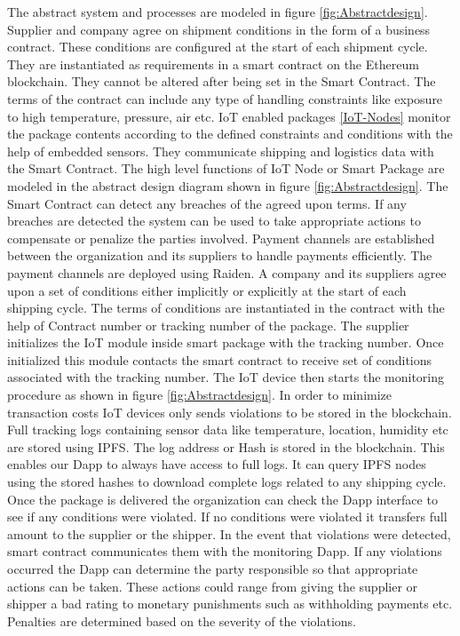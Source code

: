 The abstract system and processes are modeled in figure \ref{fig:Abstractdesign}. Supplier and company agree on shipment conditions in the form of a business contract. These conditions are configured at the start of each shipment cycle. They are instantiated as requirements in a smart contract on the Ethereum blockchain. They cannot be altered after being set in the Smart Contract. The terms of the contract can include any type of handling constraints like exposure to high temperature, pressure, air etc. IoT enabled packages \ref{IoT-Nodes} monitor the package contents according to the defined constraints and conditions with the help of embedded sensors. They communicate shipping and logistics data with the Smart Contract. The high level functions of IoT Node or Smart Package are modeled in the abstract design diagram shown in figure \ref{fig:Abstractdesign}.
\clearpage
The Smart Contract can detect any breaches of the agreed upon terms. If any breaches are detected the system can be used to take appropriate actions to compensate or penalize the parties involved. Payment channels are established between the organization and its suppliers to handle payments efficiently. The payment channels are deployed using Raiden. A company and its suppliers agree upon a set of conditions either implicitly or explicitly at the start of each shipping cycle. The terms of conditions are instantiated in the contract with the help of Contract number or tracking number of the package. The supplier initializes the IoT module inside smart package with the tracking number. Once initialized this module contacts the smart contract to receive set of conditions associated with the tracking number. The IoT device then starts the monitoring procedure as shown in figure \ref{fig:Abstractdesign}. In order to minimize transaction costs IoT devices only sends violations to be stored in the blockchain. Full tracking logs containing sensor data like temperature, location, humidity etc are stored using IPFS. The log address or Hash is stored in the blockchain. This enables our Dapp to always have access to full logs. It can query IPFS nodes using the stored hashes to download complete logs related to any shipping cycle. Once the package is delivered the organization can check the Dapp interface to see if any conditions were violated. If no conditions were violated it transfers full amount to the supplier or the shipper. In the event that violations were detected, smart contract communicates them with the monitoring Dapp. If any violations occurred the Dapp can determine the party responsible so that appropriate actions can be taken. These actions could range from giving the supplier or shipper a bad rating to monetary punishments such as withholding payments etc. Penalties are determined based on the severity of the violations.

